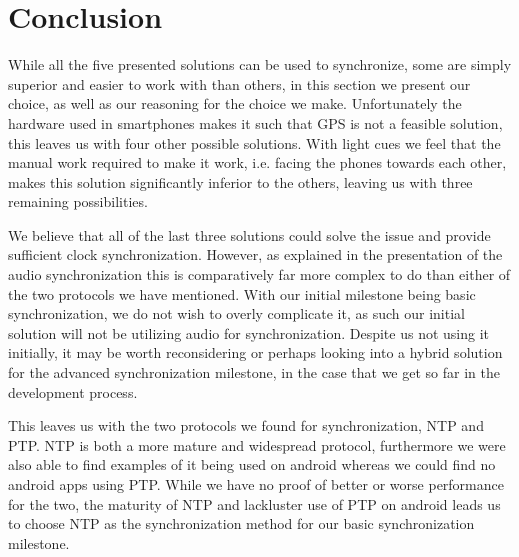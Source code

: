 
\section{Conclusion}
While all the five presented solutions can be used to synchronize, some are simply superior and easier to work with than others, in this section we present our choice, as well as our reasoning for the choice we make.
Unfortunately the hardware used in smartphones makes it such that GPS is not a feasible solution, this leaves us with four other possible solutions.
With light cues we feel that the manual work required to make it work, i.e. facing the phones towards each other, makes this solution significantly inferior to the others, leaving us with three remaining possibilities.

We believe that all of the last three solutions could solve the issue and provide sufficient clock synchronization.
However, as explained in the presentation of the audio synchronization this is comparatively far more complex to do than either of the two protocols we have mentioned.
With our initial milestone being basic synchronization, we do not wish to overly complicate it, as such our initial solution will not be utilizing audio for synchronization.
Despite us not using it initially, it may be worth reconsidering or perhaps looking into a hybrid solution for the advanced synchronization milestone, in the case that we get so far in the development process.

This leaves us with the two protocols we found for synchronization, \ac{NTP} and \ac{PTP}.
\ac{NTP} is both a more mature and widespread protocol, furthermore we were also able to find examples of it being used on android whereas we could find no android apps using \ac{PTP}.
While we have no proof of better or worse performance for the two, the maturity of \ac{NTP} and lackluster use of \ac{PTP} on android leads us to choose \ac{NTP} as the synchronization method for our basic synchronization milestone.
